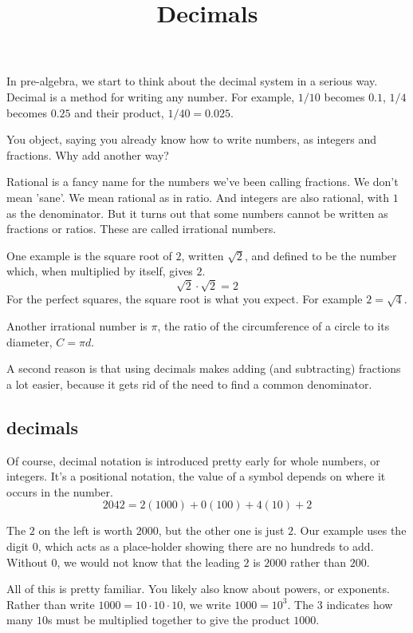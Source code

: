 \documentclass[11pt, oneside]{article}
\title{Decimals}
\date{}
\begin{document}
\maketitle
\Large


In pre-algebra, we start to think about the decimal system in a serious way.  Decimal is a method for writing any number.  For example, $1/10$ becomes $0.1$, $1/4$ becomes $0.25$ and their product, $1/40 = 0.025$.

You object, saying you already know how to write numbers, as integers and fractions.  Why add another way?

Rational is a fancy name for the numbers we've been calling fractions.  We don't mean 'sane'.  We mean rational as in ratio.  And integers are also rational, with $1$ as the denominator.  But it turns out that some numbers cannot be written as fractions or ratios.  These are called irrational numbers.  

One example is the square root of $2$, written $\sqrt{2}$, and defined to be the number which, when multiplied by itself, gives $2$.
\[ \sqrt{2} \cdot \sqrt{2} = 2 \]
For the perfect squares, the square root is what you expect.  For example $2 = \sqrt{4}$.

Another irrational number is $\pi$, the ratio of the circumference of a circle to its diameter, $C = \pi d$.

A second reason is that using decimals makes adding (and subtracting) fractions a lot easier, because it gets rid of the need to find a common denominator.

\subsection*{decimals}

Of course, decimal notation is introduced pretty early for whole numbers, or integers.  It's a positional notation, the value of a symbol depends on where it occurs in the number.
\[ 2042 = 2(1000) + 0(100) + 4(10) + 2 \]

The $2$ on the left is worth $2000$, but the other one is just $2$.  Our example uses the digit $0$, which acts as a place-holder showing there are no hundreds to add.  Without $0$, we would not know that the leading $2$ is $2000$ rather than $200$.

All of this is pretty familiar.  You likely also know about powers, or exponents.  Rather than write $1000 = 10 \cdot 10 \cdot 10$, we write $1000 = 10^3$.  The $3$ indicates how many $10$s must be multiplied together to give the product $1000$.
\end{document}
